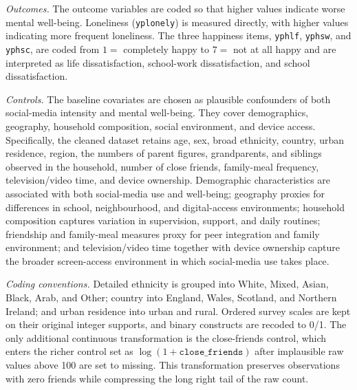 \documentclass[11pt,oneside,a4paper]{book}
\begin{document}
\textit{Outcomes.} The outcome variables are coded so that higher values indicate worse mental well-being. Loneliness (\texttt{yplonely}) is measured directly, with higher values indicating more frequent loneliness. The three happiness items, \texttt{yphlf}, \texttt{yphsw}, and \texttt{yphsc}, are coded from \(1=\) completely happy to \(7=\) not at all happy and are interpreted as life dissatisfaction, school-work dissatisfaction, and school dissatisfaction.

\textit{Controls.} The baseline covariates are chosen as plausible confounders of both social-media intensity and mental well-being. They cover demographics, geography, household composition, social environment, and device access. Specifically, the cleaned dataset retains age, sex, broad ethnicity, country, urban residence, region, the numbers of parent figures, grandparents, and siblings observed in the household, number of close friends, family-meal frequency, television/video time, and device ownership. Demographic characteristics are associated with both social-media use and well-being; geography proxies for differences in school, neighbourhood, and digital-access environments; household composition captures variation in supervision, support, and daily routines; friendship and family-meal measures proxy for peer integration and family environment; and television/video time together with device ownership capture the broader screen-access environment in which social-media use takes place.

\textit{Coding conventions.} Detailed ethnicity is grouped into White, Mixed, Asian, Black, Arab, and Other; country into England, Wales, Scotland, and Northern Ireland; and urban residence into urban and rural. Ordered survey scales are kept on their original integer supports, and binary constructs are recoded to 0/1. The only additional continuous transformation is the close-friends control, which enters the richer control set as $
\log(1+\texttt{close\_friends})$
after implausible raw values above 100 are set to missing. This transformation preserves observations with zero friends while compressing the long right tail of the raw count.
\end{document}
